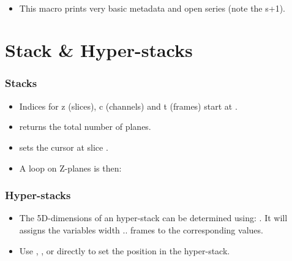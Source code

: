 \begin{frame}
  \begin{example}~\par
    \begin{itemize}
    \item This macro prints very basic metadata and open series (note the s+1).
      
    \end{itemize}
  \end{example}
\end{frame}

\section{Stack \& Hyper-stacks}
\begin{frame}[fragile]
  \frametitle<presentation>{Stacks}
  \begin{itemize}
  \item Indices for z (slices), c (channels) and t (frames) start at .
  \item {} returns the total number of planes.
  \item {} sets the cursor at slice .
  \item A loop on Z-planes is then:\par
    
  \end{itemize}
\end{frame}

\begin{frame}
  \frametitle<presentation>{Hyper-stacks}
  \begin{itemize}
  \item The 5D-dimensions of an hyper-stack can be determined using:
    . It
    will assigns the variables width .. frames to the corresponding
    values.
  \item Use , ,
     or directly
     to set the position in the
    hyper-stack.
  \end{itemize}
\end{frame}


